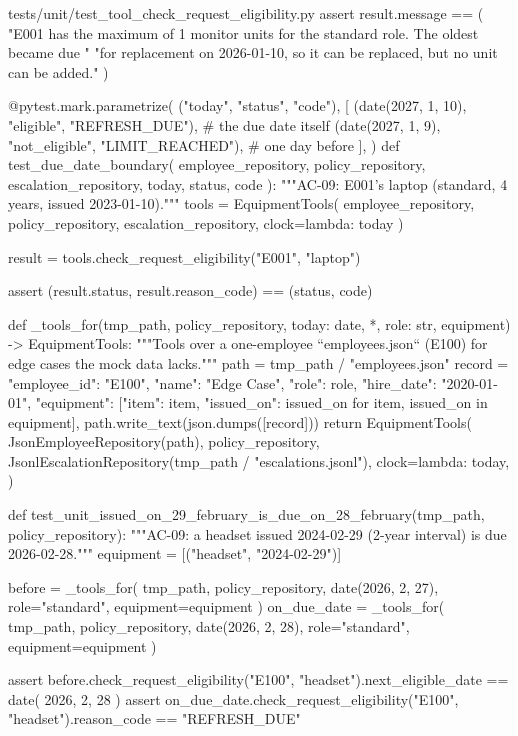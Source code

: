 \documentclass[11pt,letterpaper]{article}
\renewcommand{\_}{\textunderscore\allowbreak}
\begin{document}
\begin{codebox}{tests/unit/test_tool_check_request_eligibility.py}
    assert result.message == (
        "E001 has the maximum of 1 monitor units for the standard role. The oldest became due "
        "for replacement on 2026-01-10, so it can be replaced, but no unit can be added."
    )


@pytest.mark.parametrize(
    ("today", "status", "code"),
    [
        (date(2027, 1, 10), "eligible", "REFRESH_DUE"),  # the due date itself
        (date(2027, 1, 9), "not_eligible", "LIMIT_REACHED"),  # one day before
    ],
)
def test_due_date_boundary(
    employee_repository, policy_repository, escalation_repository, today, status, code
):
    """AC-09: E001's laptop (standard, 4 years, issued 2023-01-10)."""
    tools = EquipmentTools(
        employee_repository, policy_repository, escalation_repository, clock=lambda: today
    )

    result = tools.check_request_eligibility("E001", "laptop")

    assert (result.status, result.reason_code) == (status, code)


def _tools_for(tmp_path, policy_repository, today: date, *, role: str, equipment) -> EquipmentTools:
    """Tools over a one-employee ``employees.json`` (E100) for edge cases the mock data lacks."""
    path = tmp_path / "employees.json"
    record = {
        "employee_id": "E100",
        "name": "Edge Case",
        "role": role,
        "hire_date": "2020-01-01",
        "equipment": [{"item": item, "issued_on": issued_on} for item, issued_on in equipment],
    }
    path.write_text(json.dumps([record]))
    return EquipmentTools(
        JsonEmployeeRepository(path),
        policy_repository,
        JsonlEscalationRepository(tmp_path / "escalations.jsonl"),
        clock=lambda: today,
    )


def test_unit_issued_on_29_february_is_due_on_28_february(tmp_path, policy_repository):
    """AC-09: a headset issued 2024-02-29 (2-year interval) is due 2026-02-28."""
    equipment = [("headset", "2024-02-29")]

    before = _tools_for(
        tmp_path, policy_repository, date(2026, 2, 27), role="standard", equipment=equipment
    )
    on_due_date = _tools_for(
        tmp_path, policy_repository, date(2026, 2, 28), role="standard", equipment=equipment
    )

    assert before.check_request_eligibility("E100", "headset").next_eligible_date == date(
        2026, 2, 28
    )
    assert on_due_date.check_request_eligibility("E100", "headset").reason_code == "REFRESH_DUE"



\end{codebox}
\end{document}
